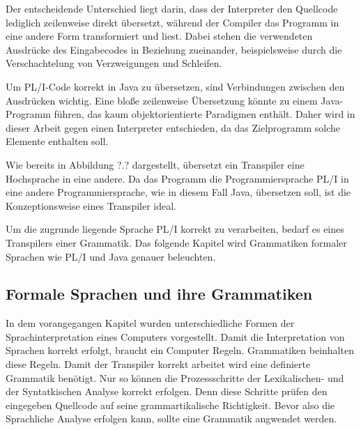 Der entscheidende Unterschied liegt darin, dass der Interpreter den Quellcode lediglich zeilenweise direkt übersetzt, während der Compiler das Programm in eine andere Form transformiert und liest. Dabei stehen die verwendeten Ausdrücke des Eingabecodes in Beziehung zueinander, beispielsweise durch die Verschachtelung von Verzweigungen und Schleifen.

Um PL/I-Code korrekt in Java zu übersetzen, sind Verbindungen zwischen den Ausdrücken wichtig. Eine bloße zeilenweise Übersetzung könnte zu einem Java-Programm führen, das kaum objektorientierte Paradigmen enthält. Daher wird in dieser Arbeit gegen einen Interpreter entschieden, da das Zielprogramm solche Elemente enthalten soll.

 Wie bereits in Abbildung ?.? dargestellt, übersetzt ein Transpiler eine Hochsprache in eine andere. Da das Programm die Programmiersprache PL/I in eine andere Programmiersprache, wie in diesem Fall Java, übersetzen soll, ist die Konzeptionsweise eines Transpiler ideal.

Um die zugrunde liegende Sprache PL/I korrekt zu verarbeiten, bedarf es eines Transpilers einer Grammatik. Das folgende Kapitel wird Grammatiken formaler Sprachen wie PL/I und Java genauer beleuchten.


\pagebreak
   
   
\subsection{Formale Sprachen und ihre Grammatiken}
In dem vorangegangen Kapitel wurden unterschiedliche Formen der Sprachinterpretation eines Computers vorgestellt. Damit die Interpretation von Sprachen korrekt erfolgt, braucht ein Computer Regeln. Grammatiken beinhalten diese Regeln. Damit der Transpiler korrekt arbeitet wird eine definierte Grammatik benötigt. Nur so können die Prozessschritte der Lexikalischen- und der Syntatkischen Analyse korrekt erfolgen. Denn diese Schritte prüfen den eingegeben Quellcode auf seine grammartikalische Richtigkeit. Bevor also die Sprachliche Analyse erfolgen kann, sollte eine Grammatik angwendet werden.
	

